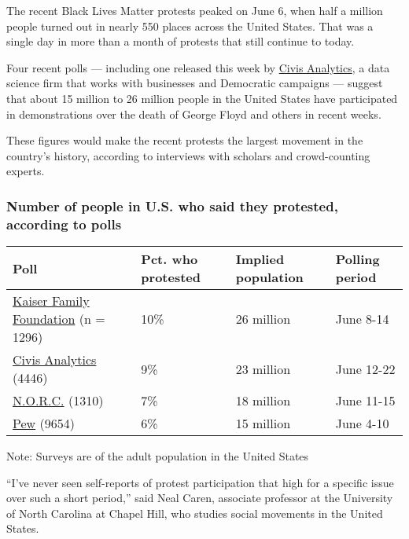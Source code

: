 The recent Black Lives Matter protests peaked on June 6, when half a
million people turned out in nearly 550 places across the United States.
That was a single day in more than a month of protests that still
continue to today.

Four recent polls --- including one released this week by
\href{https://www.civisanalytics.com/}{Civis Analytics}, a data science
firm that works with businesses and Democratic campaigns --- suggest
that about 15 million to 26 million people in the United States have
participated in demonstrations over the death of George Floyd and others
in recent weeks.

These figures would make the recent protests the largest movement in the
country's history, according to interviews with scholars and
crowd-counting experts.

\hypertarget{number-of-people-in-us-who-said-they-protested-according-to-polls}{%
\subsubsection{Number of people in U.S. who said they protested,
according to
polls}\label{number-of-people-in-us-who-said-they-protested-according-to-polls}}

\begin{longtable}[]{@{}llll@{}}
\toprule
Poll & Pct. who protested & Implied population & Polling
period\tabularnewline
\midrule
\endhead
\href{https://www.kff.org/disparities-policy/report/kff-health-tracking-poll-june-2020/}{Kaiser
Family Foundation} (n = 1296) & 10\% & 26 million & June
8-14\tabularnewline
\href{https://www.civisanalytics.com/blog/data-science/coronavirus-pulse-survey-research/\#BLM}{Civis
Analytics} (4446) & 9\% & 23 million & June 12-22\tabularnewline
\href{http://www.apnorc.org/PDFs/AP-NORC\%20June\%202020/topline_release3.pdf}{N.O.R.C.}
(1310) & 7\% & 18 million & June 11-15\tabularnewline
\href{https://www.pewsocialtrends.org/2020/06/12/amid-protests-majorities-across-racial-and-ethnic-groups-express-support-for-the-black-lives-matter-movement/}{Pew}
(9654) & 6\% & 15 million & June 4-10\tabularnewline
\bottomrule
\end{longtable}

Note: Surveys are of the adult population in the United States

``I've never seen self-reports of protest participation that high for a
specific issue over such a short period,'' said Neal Caren, associate
professor at the University of North Carolina at Chapel Hill, who
studies social movements in the United States.

